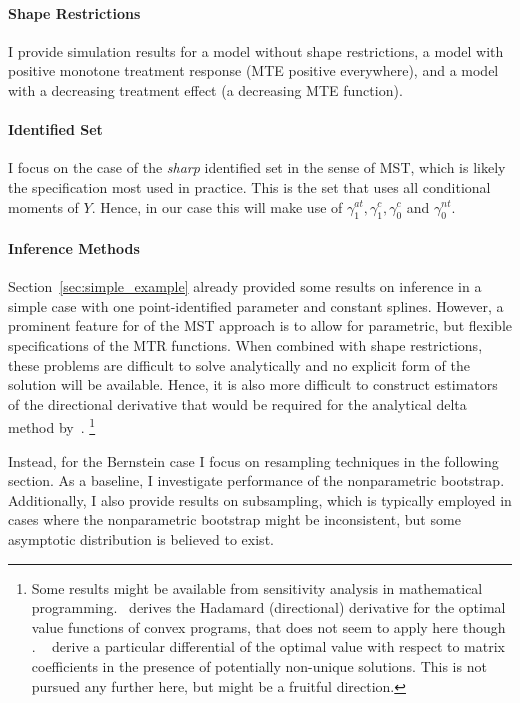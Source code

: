 \documentclass[12pt,a4paper,english]{article} %
\numberwithin{equation}{section}
\theoremstyle{definition}
\theoremstyle{remark}
\theoremstyle{plain}
\begin{document}
\paragraph{Shape Restrictions}
I provide simulation results for a model without shape restrictions, a model with positive monotone treatment response (MTE positive everywhere), and a model with a decreasing treatment effect (a decreasing MTE function).

\paragraph{Identified Set}
I focus on the case of the \textit{sharp} identified set in the sense of MST, which is likely the specification most used in practice.
This is the set that uses all conditional moments of $Y$.
Hence, in our case this will make use of $\gamma_1^{at}, \gamma_1^{c}, \gamma_0^{c}$ and $\gamma_0^{nt}$.

\paragraph{Inference Methods}
Section~\ref{sec:simple_example} already provided some results on inference in a simple case with one point-identified parameter and constant splines.
However, a prominent feature for of the MST approach is to allow for parametric, but flexible specifications of the MTR functions.
When combined with shape restrictions, these problems are difficult to solve analytically and no explicit form of the solution will be available.
Hence, it is also more difficult to construct estimators of the directional derivative that would be required for the analytical delta method by~\cite{fang2019infdirdiff}.
\footnote{Some results might be available from sensitivity analysis in mathematical programming.~\cite{shapiro1991asymptotic} derives the Hadamard (directional) derivative for the optimal value functions of convex programs, that does not seem to apply here though \citep{bhattacharya2009inferring}.
~\cite{de_wolf_smeers2021generalized} derive a particular differential of the optimal value with respect to matrix coefficients in the presence of potentially non-unique solutions.
This is not pursued any further here, but might be a fruitful direction.}

Instead, for the Bernstein case I focus on resampling techniques in the following section.
As a baseline, I investigate performance of the nonparametric bootstrap.
Additionally, I also provide results on subsampling, which is typically employed in cases where the nonparametric bootstrap might be inconsistent, but some asymptotic distribution is believed to exist.
\end{document}
